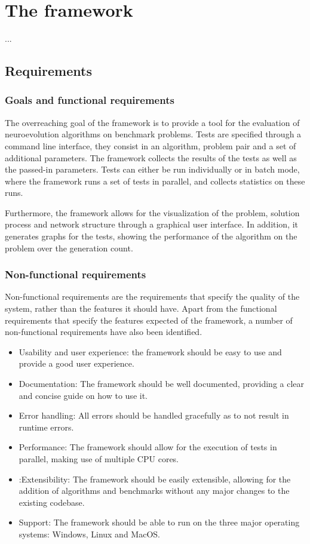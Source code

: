 \chapter{The framework}
\label{chap:framework}

...

\section{Requirements}

\subsection{Goals and functional requirements}

The overreaching goal of the framework is to provide a tool for the evaluation of neuroevolution algorithms on benchmark problems.
Tests are specified through a command line interface, they consist in an algorithm, problem pair and a set of additional parameters.
The framework collects the results of the tests as well as the passed-in parameters.
Tests can either be run individually or in batch mode, where the framework runs a set of tests in parallel, and collects statistics on these runs.

Furthermore, the framework allows for the visualization of the problem, solution process and network structure through a graphical user interface.
In addition, it generates graphs for the tests, showing the performance of the algorithm on the problem over the generation count.

\subsection{Non-functional requirements}

Non-functional requirements are the requirements that specify the quality of the system, rather than the features it should have.
Apart from the functional requirements that specify the features expected of the framework, a number of non-functional requirements have also been identified.

\begin{itemize}
    \item Usability and user experience: the framework should be easy to use and provide a good user experience.
    \item Documentation: The framework should be well documented, providing a clear and concise guide on how to use it.
    \item Error handling: All errors should be handled gracefully as to not result in runtime errors.
    \item Performance: The framework should allow for the execution of tests in parallel, making use of multiple CPU cores.
    \item:Extensibility: The framework should be easily extensible, allowing for the addition of algorithms and benchmarks without any
    major changes to the existing codebase.
    \item Support: The framework should be able to run on the three major operating systems: Windows, Linux and MacOS.
\end{itemize}
